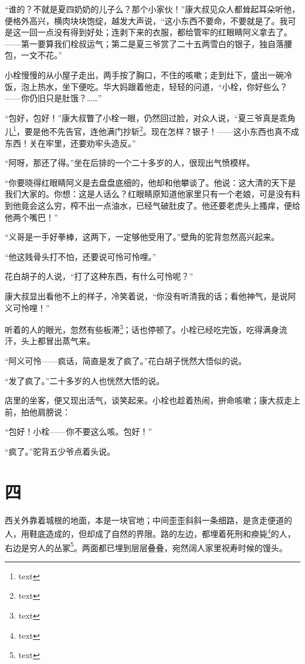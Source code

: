 \documentclass[12pt,UTF8]{ctexbook}
\begin{document}
“谁的？不就是夏四奶奶的儿子么？那个小家伙！”康大叔见众人都耸起耳朵听他，便格外高兴，横肉块块饱绽，越发大声说，“这小东西不要命，不要就是了。我可是这一回一点没有得到好处；连剥下来的衣服，都给管牢的红眼睛阿义拿去了。——第一要算我们栓叔运气；第二是夏三爷赏了二十五两雪白的银子，独自落腰包，一文不花。”

小栓慢慢的从小屋子走出，两手按了胸口，不住的咳嗽；走到灶下，盛出一碗冷饭，泡上热水，坐下便吃。华大妈跟着他走，轻轻的问道，“小栓，你好些么？——你仍旧只是肚饿？……”

“包好，包好！”康大叔瞥了小栓一眼，仍然回过脸，对众人说，“夏三爷真是乖角儿\footnote{text}，要是他不先告官，连他满门抄斩\footnote{text}。现在怎样？银子！——这小东西也真不成东西！关在牢里，还要劝牢头造反。”

“阿呀，那还了得。”坐在后排的一个二十多岁的人，很现出气愤模样。

“你要晓得红眼睛阿义是去盘盘底细的，他却和他攀谈了。他说：这大清的天下是我们大家的。你想：这是人话么？红眼睛原知道他家里只有一个老娘，可是没有料到他竟会这么穷，榨不出一点油水，已经气破肚皮了。他还要老虎头上搔痒，便给他两个嘴巴！”

“义哥是一手好拳棒，这两下，一定够他受用了。”壁角的驼背忽然高兴起来。

“他这贱骨头打不怕，还要说可怜可怜哩。”

花白胡子的人说，“打了这种东西，有什么可怜呢？”

康大叔显出看他不上的样子，冷笑着说，“你没有听清我的话；看他神气，是说阿义可怜哩！”

听着的人的眼光，忽然有些板滞\footnote{text}；话也停顿了。小栓已经吃完饭，吃得满身流汗，头上都冒出蒸气来。

“阿义可怜——疯话，简直是发了疯了。”花白胡子恍然大悟似的说。

“发了疯了。”二十多岁的人也恍然大悟的说。

店里的坐客，便又现出活气，谈笑起来。小栓也趁着热闹，拚命咳嗽；康大叔走上前，拍他肩膀说：

“包好！小栓——你不要这么咳。包好！”

“疯了。”驼背五少爷点着头说。

\chapter{四}

西关外靠着城根的地面，本是一块官地；中间歪歪斜斜一条细路，是贪走便道的人，用鞋底造成的，但却成了自然的界限。路的左边，都埋着死刑和瘐毙\footnote{text}的人，右边是穷人的丛冢\footnote{text}。两面都已埋到层层叠叠，宛然阔人家里祝寿时候的馒头。
\end{document}
